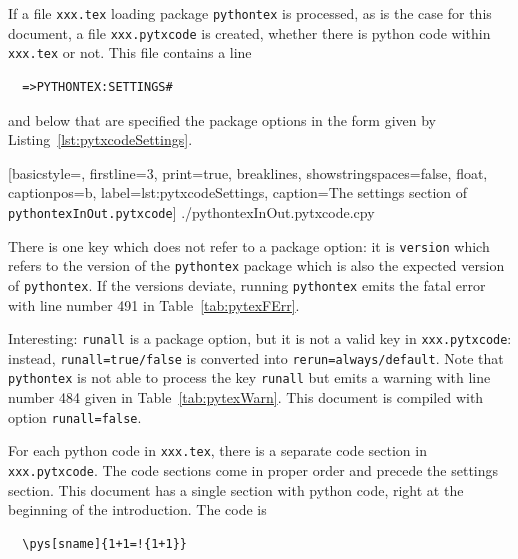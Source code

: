 \documentclass[a4paper, english]{article}%
\newcommand{\pytex}{\texttt{pythontex}}
\begin{document}
If a file \texttt{xxx.tex} loading package \texttt{pythontex} is processed, 
as is the case for this document, 
a file \texttt{xxx.pytxcode} is created, 
whether there is python code within \texttt{xxx.tex} or not. 
This file contains a line 
%
\begin{verbatim}
  =>PYTHONTEX:SETTINGS#
\end{verbatim}
%
and below that are specified the package options in the form given by Listing~\ref{lst:pytxcodeSettings}. 



%
[basicstyle=\scriptsize,
firstline=3, print=true,
breaklines, showstringspaces=false,
float,
captionpos=b, label={lst:pytxcodeSettings},
caption={The settings section of \texttt{pythontexInOut.pytxcode}}]
{./pythontexInOut.pytxcode.cpy}



There is one key which does not refer to a package option: it is \texttt{version} 
which refers to the version of the \texttt{pythontex} package 
which is also the expected version of \pytex. 
If the versions deviate, running \pytex{} emits the fatal error with line number 491 in Table~\ref{tab:pytexFErr}. 

Interesting: \texttt{runall} is a package option, but it is not a valid key in \texttt{xxx.pytxcode}: 
instead, \texttt{runall=true/false} is converted into \texttt{rerun=always/default}. 
Note that \texttt{pythontex} is not able to process the key \texttt{runall} 
but emits a warning with line number 484 given in Table~\ref{tab:pytexWarn}. 
This document is compiled with option \texttt{runall=false}. 

For each python code in \texttt{xxx.tex}, there is a separate code section in \texttt{xxx.pytxcode}. 
The code sections come in proper order and precede the settings section. 
This document has a single section with python code, right at the beginning of the introduction. 
The code is 
%
\begin{verbatim}
  \pys[sname]{1+1=!{1+1}}
\end{verbatim}
\end{document}
